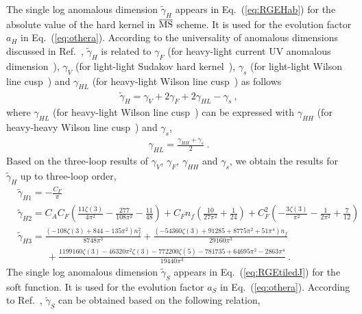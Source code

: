 \documentclass[a4paper,11pt]{article}
\begin{document}
The single log anomalous dimension $\tilde \gamma_H$ appears in Eq.~(\ref{eq:RGEHab}) for the absolute value of the hard kernel in $\overline{\rm MS}$ scheme. It is used for the evolution factor $a_H$ in Eq.~(\ref{eq:othera}). According to the universality of anomalous dimensions discussed in Ref.~\cite{Ji:2023pba}, $\tilde \gamma_H$ is related to $\gamma_F$ (for heavy-light current UV anomalous dimension~\cite{Ji:1991pr, Chetyrkin:2003vi}), $\gamma_V$ (for light-light Sudakov hard kernel~\cite{Moch:2005id,Becher:2006mr}), $\gamma_s$ (for light-light Wilson line cusp~\cite{Korchemskaya:1992je}) and $\gamma_{HL}$ (for heavy-light Wilson line cusp~\cite{Korchemsky:1992xv}) as follows
\begin{align}\label{eq:gammaHtNNNLO}
\tilde \gamma_H =  \gamma_V + 2\gamma_F + 2 \gamma_{HL} - \gamma_s \ ,
\end{align}
where $\gamma_{HL}$ (for heavy-light Wilson line cusp~\cite{Korchemsky:1992xv}) can be expressed with $\gamma_{HH}$ (for heavy-heavy Wilson line cusp~\cite{Ji:2019ewn,Ji:2020ect,Ji:2021znw}) and $\gamma_s$,
\begin{align}
\gamma_{HL} = \frac{\gamma_{HH}+\gamma_s}{2} \ .
\end{align}
Based on the three-loop results of $\gamma_V$\cite{Becher:2006mr}, $\gamma_F$\cite{Braun:2020ymy}, $\gamma_{HH}$\cite{Bruser:2019yjk} and $\gamma_s$\cite{Moult:2022xzt}, we obtain the results for $\tilde \gamma_H$ up to three-loop order,
\begin{align}
&\tilde \gamma_{H1} = -\frac{C_F}{\pi } \nonumber\\
&\tilde \gamma_{H2} =
C_A C_F\left(\frac{11 \zeta (3)}{4 \pi ^2}-\frac{277}{108 \pi ^2}-\frac{11}{48}\right)
+C_F n_f\left(\frac{10}{27 \pi ^2}+\frac{1}{24}\right)
+C_F^2\left(-\frac{3 \zeta (3)}{\pi^2}-\frac{1}{2 \pi ^2}+\frac{7}{12}\right) \nonumber\\
&\tilde \gamma_{H3}= \frac{\left(-108 \zeta (3)+844-135 \pi ^2\right) n_f^2}{8748 \pi ^3}+\frac{\left(-54360 \zeta(3)+91285+8775 \pi ^2+51 \pi ^4\right) n_f}{29160 \pi ^3} \nonumber\\
&\quad \quad \quad +\frac{1199160 \zeta (3)-46320 \pi^2 \zeta (3)-772200 \zeta (5)-781735+64695 \pi ^2-2863 \pi ^4}{19440 \pi ^3} \ .
\end{align}
The single log anomalous dimension $\tilde \gamma_S$ appears in Eq.~(\ref{eq:RGEtiledJ}) for the soft function. It is used for the evolution factor $a_S$ in Eq.~(\ref{eq:othera}). According to Ref.~\cite{Ji:2023pba}, $\tilde \gamma_S$ can be obtained based on the following relation,
\end{document}
